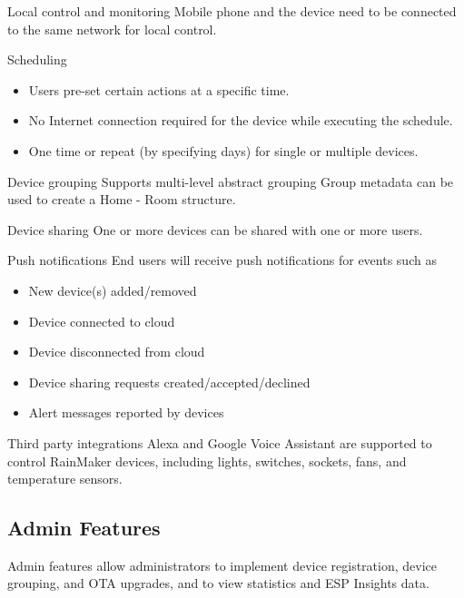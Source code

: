 \documentclass[a4paper,12pt]{book}
\begin{document}
\begin{term}{Local control and monitoring}
    Mobile phone and the device need to be connected to the same network for local control.
\end{term}

\begin{term}{Scheduling}
    \begin{itemize}
        \item Users pre-set certain actions at a specific time.
        \item No Internet connection required for the device while executing the schedule.
        \item One time or repeat (by specifying days) for single or multiple devices.
    \end{itemize}
\end{term}

\begin{term}{Device grouping}
    Supports multi-level abstract grouping Group metadata can be used to create a Home - Room structure.
\end{term}

\begin{term}{Device sharing}
    One or more devices can be shared with one or more users.
\end{term}

\begin{term}{Push notifications}
    End users will receive push notifications for events such as
    \begin{itemize}
        \item New device(s) added/removed
        \item Device connected to cloud
        \item Device disconnected from cloud
        \item Device sharing requests created/accepted/declined
        \item Alert messages reported by devices
    \end{itemize}
\end{term}

\begin{term}{Third party integrations}
    Alexa and Google Voice Assistant are supported to control RainMaker devices, including lights, switches, sockets, fans, and temperature sensors.
\end{term}

\subsection{Admin Features}
Admin features allow administrators to implement device registration, device grouping, and OTA upgrades, and to view statistics and ESP Insights data.
\end{document}
